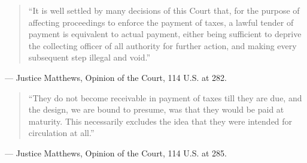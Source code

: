 \documentclass[12pt]{article}
\begin{document}
\begin{quote}
``It is well settled by many decisions of this Court that, for the purpose of affecting proceedings to enforce the payment of taxes, a lawful tender of payment is equivalent to actual payment, either being sufficient to deprive the collecting officer of all authority for further action, and making every subsequent step illegal and void.''
\end{quote}
\noindent --- Justice Matthews, Opinion of the Court, 114 U.S. at 282.

\begin{quote}
``They do not become receivable in payment of taxes till they are due, and the design, we are bound to presume, was that they would be paid at maturity. This necessarily excludes the idea that they were intended for circulation at all.''
\end{quote}
\noindent --- Justice Matthews, Opinion of the Court, 114 U.S. at 285.
\end{document}
